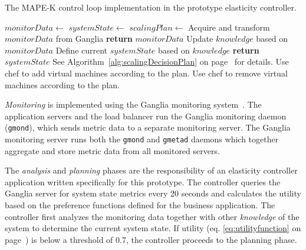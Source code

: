 \documentclass[english]{tktltiki2}
\theoremstyle{definition}
\theoremstyle{remark}
\begin{document}
\begin{algorithm}[!h]
  \caption{The MAPE-K control loop implementation in the prototype elasticity controller.}\label{alg:scalingDecision}
  \begin{algorithmic}[1]
    	\State $monitorData \gets$  
    	\State $systemState \gets$  
    		\State $scalingPlan \gets$ 
	    	\State {}
    	\EndIf
    \Statex
    	\State Acquire and transform $monitorData$ from Ganglia
    	\State \textbf{return} $monitorData$
    \EndProcedure
    \Statex
    	\State Update $knowledge$ based on $monitorData$
    	\State Define current $systemState$ based on $knowledge$
    	\State \textbf{return} $systemState$
    \EndProcedure
    \Statex
    	\State See Algorithm~\ref{alg:scalingDecisionPlan} on page~\pageref{alg:scalingDecisionPlan} for details.
    \EndProcedure
    \Statex
    		\State Use chef to add virtual machines according to the plan.
    		\State Use chef to remove virtual machines according to the plan.
    	\EndIf
    \EndProcedure
  \end{algorithmic}
\end{algorithm}

\textit{Monitoring} is implemented using the Ganglia monitoring
system~\cite{gangliapaper}. The application servers and the load balancer run the
Ganglia monitoring daemon (\texttt{gmond}), which sends metric data to a
separate monitoring server. The Ganglia monitoring server runs both the
\texttt{gmond} and \texttt{gmetad} daemons which together aggregate and store metric
data from all monitored servers. 

The \textit{analysis} and \textit{planning} phases are the responsibility of
an elasticity controller application written specifically for this prototype.
The controller queries the Ganglia server for system state metrics every 20
seconds and calculates the utility based on the preference functions defined
for the business application. The controller first analyzes the monitoring
data together with other \textit{knowledge} of the system to determine the
current system state. If utility (eq. \ref{eq:utilityfunction} on
page~\pageref{eq:utilityfunction}) is below a threshold of 0.7, the controller
proceeds to the planning phase.
\end{document}
